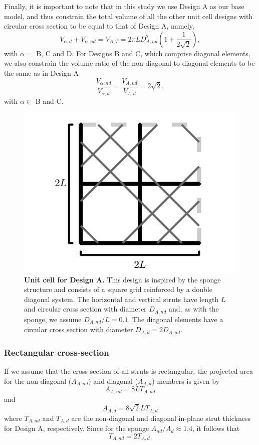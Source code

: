 \documentclass[10pt,twoside]{fernandes_supp}
\begin{document}
Finally, it is important to note that in this study we use Design A as our base model, and thus constrain the total volume of all the other unit cell designs with circular cross section to be equal to that of Design A, namely,
\begin{equation}\label{con1}
V_{\alpha,d}+V_{\alpha,nd}={V}_{A,T}=2\pi L D_{A,nd}^2 \left(1+\frac{1}{2\sqrt{2}}\right),
\end{equation}
with $\alpha=$ B, C and D.
For Designs B and C, which comprise diagonal elements, we also  constrain the volume ratio of the non-diagonal to diagonal elements to be the same as in Design A
\begin{equation}\label{con2}
\frac{V_{\alpha,nd}}{V_{\alpha,d}}=\frac{V_{A,nd}}{V_{A,d}}=2\sqrt{2},
\end{equation}
with $\alpha\in$ B and C.

\begin{figure}[H]
    \centering
    \includegraphics[width=0.4\linewidth]{SFig2.png}
    \caption{{\bf Unit cell for Design A.} This design is inspired by the sponge structure and consists of a square grid  reinforced by a double diagonal system. The horizontal and vertical struts have length $L$ and circular cross section with diameter $D_{A,nd}$ and, as with the sponge, we assume $D_{A,nd}/L=0.1$. The diagonal elements have a circular cross section  with diameter $D_{A,d}=2 D_{A,nd}$.}
    \label{DesignA}
\end{figure}

\subsubsection{Rectangular cross-section}

If we assume that the cross section of all struts is rectangular, the projected-area  for the non-diagonal ($A_{A,nd}$) and diagonal ($A_{A,d}$) members is given by
\begin{equation}
	A_{A,nd}=8LT_{A,nd}
\end{equation}
and
\begin{equation}
	A_{A,d}=8\sqrt{2}LT_{A,d}
\end{equation}
where  $T_{A,nd}$ and $T_{A,d}$ are the non-diagonal and diagonal in-plane strut thickness for Design A, respectively.
Since for the sponge   $A_{nd}/A_d\approx 1.4$, it follows that
\begin{equation}
	T_{A,nd}=2T_{A,d}.
\end{equation}
\end{document}
